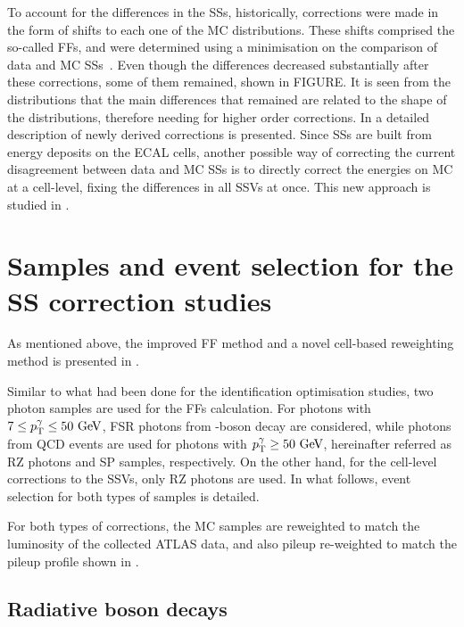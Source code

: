 To account for the differences in the \acp{SS}, historically, corrections were made in the form of shifts to each one of the \ac{MC} distributions. These shifts comprised the so-called \acp{FF}, and were determined using a \chisq minimisation on the comparison of data and \ac{MC} \acp{SS}~\cite{ATLAS-EGamma-Performance-2015-2016,ATLAS-EGamma-Performance-2015-2017}.
Even though the differences decreased substantially after these corrections, some of them remained, shown in FIGURE. It is seen from the distributions that the main differences that remained are related to the shape of the distributions, therefore needing for higher order corrections. In \Ch{\ref{ch:ffs}} a detailed description of newly derived corrections is presented.
Since \acp{SS} are built from energy deposits on the \ac{ECAL} cells, another possible way of correcting the current disagreement between data and \ac{MC} \acp{SS} is to directly correct the energies on \ac{MC} at a cell-level, fixing the differences in all \acp{SSV} at once. This new approach is studied in \Ch{\ref{ch:cellrw}}.


\section{Samples and event selection for the \ac{SS} correction studies}

As mentioned above, the improved \ac{FF} method and a novel cell-based reweighting method is presented in \Chs{\ref{ch:ffs}}{\ref{ch:cellrw}}.

Similar to what had been done for the identification optimisation studies, two photon samples are used for the \acp{FF} calculation. For photons with \(7\leq p_{\text{T}}^{\gamma}\leq 50~\text{GeV}\), \ac{FSR} photons from \Zboson-boson decay are considered, while photons from \ac{QCD} \gammajet events are used for photons with \(p_{\text{T}}^{\gamma}\geq50~\text{GeV}\), hereinafter referred as \ac{RZ} photons and \ac{SP} samples, respectively. On the other hand, for the cell-level corrections to the \acp{SSV}, only \ac{RZ} photons are used. In what follows, event selection for both types of samples is detailed.

For both types of corrections, the \ac{MC} samples are reweighted to match the luminosity of the collected \ac{ATLAS} data, and also pileup re-weighted to match the pileup profile shown in \Sect{\ref{sec:atlas:runs}}.

\subsection{Radiative \Zboson boson decays}

